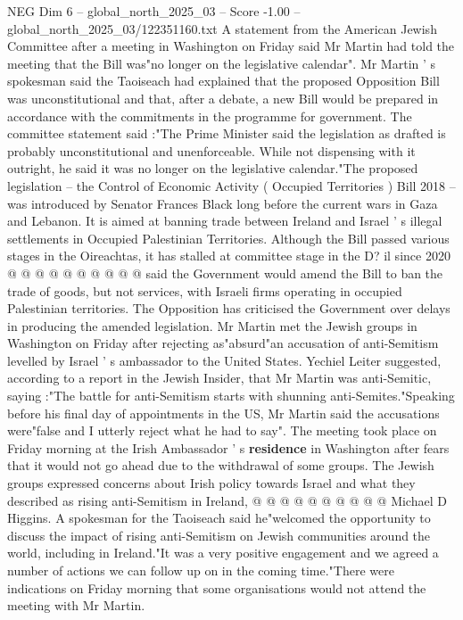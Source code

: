 \begin{textsample}{NEG Dim 6 – global\_north\_2025\_03 – Score -1.00 – global\_north\_2025\_03/122351160.txt}  \label{ex:f6_neg_231}
A statement from the American Jewish Committee after a meeting in Washington on Friday said Mr Martin had told the meeting that the Bill was"no longer on the legislative calendar".
Mr Martin ' s spokesman said the Taoiseach had explained that the proposed Opposition Bill was unconstitutional and that, after a debate, a new Bill would be prepared in accordance with the commitments in the programme for government.
The committee statement said :"The Prime Minister said the legislation as drafted is probably unconstitutional and unenforceable.
While not dispensing with it outright, he said it was no longer on the legislative calendar."The proposed legislation -- the Control of Economic Activity ( Occupied Territories ) Bill 2018 -- was introduced by Senator Frances Black long before the current wars in Gaza and Lebanon.
It is aimed at banning trade between Ireland and Israel ' s illegal settlements in Occupied Palestinian Territories.
Although the Bill passed various stages in the Oireachtas, it has stalled at committee stage in the D? il since 2020 @ @ @ @ @ @ @ @ @ @ said the Government would amend the Bill to ban the trade of goods, but not services, with Israeli firms operating in occupied Palestinian territories.
The Opposition has criticised the Government over delays in producing the amended legislation.
Mr Martin met the Jewish groups in Washington on Friday after rejecting as"absurd"an accusation of anti-Semitism levelled by Israel ' s ambassador to the United States.
Yechiel Leiter suggested, according to a report in the Jewish Insider, that Mr Martin was anti-Semitic, saying :"The battle for anti-Semitism starts with shunning anti-Semites."Speaking before his final day of appointments in the US, Mr Martin said the accusations were"false and I utterly reject what he had to say".
The meeting took place on Friday morning at the Irish Ambassador ' s \textbf{residence} in Washington after fears that it would not go ahead due to the withdrawal of some groups.
The Jewish groups expressed concerns about Irish policy towards Israel and what they described as rising anti-Semitism in Ireland, @ @ @ @ @ @ @ @ @ @ Michael D Higgins.
A spokesman for the Taoiseach said he"welcomed the opportunity to discuss the impact of rising anti-Semitism on Jewish communities around the world, including in Ireland."It was a very positive engagement and we agreed a number of actions we can follow up on in the coming time."There were indications on Friday morning that some organisations would not attend the meeting with Mr Martin.

\end{textsample}
